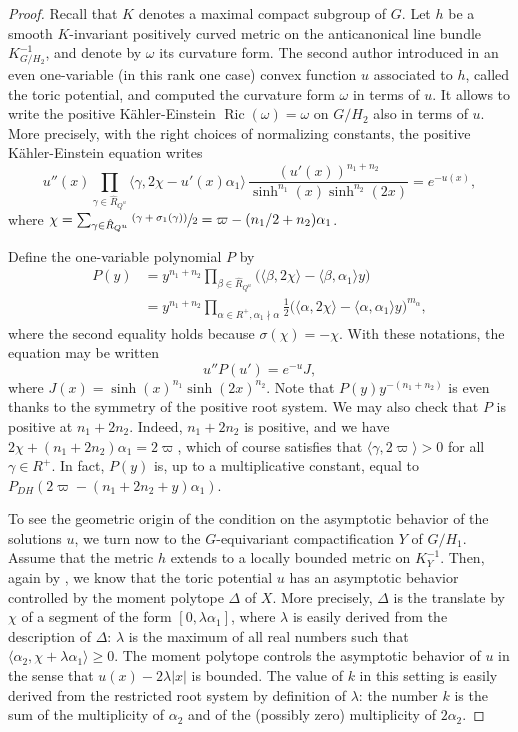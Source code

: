 \documentclass[10pt]{amsart}
\newcommand{\psfrac}[2]{\sfrac{(#1)}{#2}}
\theoremstyle{plain}
\theoremstyle{definition}
\DeclareMathOperator{\Ric}{Ric}
\newcommand{\Roots}{\hat{R}}
\newcommand{\rRoots}{R}
\begin{document}
\begin{proof}
Recall that $K$ denotes a maximal compact subgroup of $G$.
Let $h$ be a smooth $K$-invariant positively curved metric on the anticanonical
line bundle $K_{G/H_2}^{-1}$, and denote by $\omega$ its curvature form.
The second author introduced in \cite{DelHoro} an even one-variable (in this rank one case)
convex function $u$ associated to $h$,
called the toric potential, and computed the curvature form $\omega$ in terms of $u$.
It allows to write the positive Kähler-Einstein $\Ric(\omega)=\omega$ on $G/H_2$ also
in terms of $u$.
More precisely, with the right choices of normalizing constants,
the positive Kähler-Einstein equation writes
\begin{equation}
u''(x)\prod_{\gamma\in \Roots_{Q^u}}\langle\gamma,2\chi-u'(x)\alpha_1\rangle\,
\frac{(u'(x))^{n_1+n_2}}{\sinh^{n_1}(x)\sinh^{n_2}(2x)} = e^{-u(x)},
\end{equation}
where $\chi=\sum_{\gamma\in \Roots_{Q^u}}\psfrac{\gamma+\sigma_1(\gamma)}{2}
=\varpi - (n_1/2+n_2)\alpha_1$.

Define the one-variable polynomial $P$ by
\begin{align*}
P(y)& =y^{n_1+n_2}\prod_{\beta\in \Roots_{Q^u}}\big(\langle\beta,2\chi\rangle-\langle\beta,\alpha_1\rangle y\big) \\
&= y^{n_1+n_2}\prod_{\alpha\in \rRoots^+, \alpha_1\nmid \alpha}\frac{1}{2}\big(\langle\alpha,2\chi\rangle-\langle\alpha,\alpha_1\rangle y\big)^{m_{\alpha}},
\end{align*}
where the second equality holds because $\sigma(\chi)=-\chi$.
With these notations, the equation may be written
\[ u''P(u')=e^{-u}J,\]
where $J(x)=\sinh(x)^{n_1}\sinh(2x)^{n_2}$.
Note that $P(y)y^{-(n_1+n_2)}$ is even thanks to the symmetry of the positive root system.
We may also check that $P$ is positive at $n_1+2n_2$. Indeed, $n_1+2n_2$ is positive, and we have
$2\chi+(n_1+2n_2)\alpha_1=2\varpi$, which of course satisfies that
$\langle\gamma,2\varpi\rangle>0$ for all $\gamma\in \rRoots^+$.
In fact, $P(y)$ is, up to a multiplicative constant, equal to $P_{DH}(2\varpi-(n_1+2n_2+y)\alpha_1)$.

To see the geometric origin of the condition on the asymptotic behavior of the
solutions $u$, we turn now to the $G$-equivariant compactification $Y$ of $G/H_1$.
Assume that the metric $h$ extends to a locally bounded metric on $K_Y^{-1}$.
Then, again by \cite{DelHoro}, we know that the toric
potential $u$ has an asymptotic behavior controlled by the moment polytope $\Delta$
of $X$. More precisely, $\Delta$ is the translate by $\chi$ of a segment of
the form $[0,\lambda \alpha_1]$, where
$\lambda$ is easily derived from the description of $\Delta$: $\lambda$ is the maximum
of all real numbers such that $\langle\alpha_2,\chi+\lambda \alpha_1\rangle\geq 0$.
The moment polytope controls the asymptotic behavior of $u$ in the sense that
$u(x)-2\lambda|x|$ is bounded.
The value of $k$ in this setting is easily derived from the restricted root
system by definition of $\lambda$: the number $k$ is the sum of the multiplicity
of $\alpha_2$ and of the (possibly zero) multiplicity of $2\alpha_2$.


\end{proof}
\end{document}
